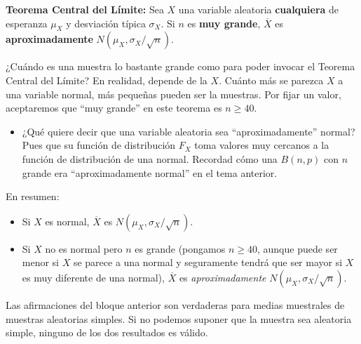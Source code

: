 \documentclass[
  spanish,
  letterpaper,
  DIV=11,
  numbers=noendperiod]{scrreprt}
\providecommand{\tightlist}{%
  \setlength{\itemsep}{0pt}\setlength{\parskip}{0pt}}
\begin{document}
\textbf{Teorema Central del Límite:} Sea \(X\) una variable aleatoria
\textbf{cualquiera} de esperanza \(\mu_X\) y desviación típica
\(\sigma_X\). Si \(n\) es \textbf{muy grande}, \(\overline{X}\) es
\textbf{aproximadamente} \(N(\mu_X, {\sigma_X}/{\sqrt{n}})\).

¿Cuándo es una muestra lo bastante grande como para poder invocar el
Teorema Central del Límite? En realidad, depende de la \(X\). Cuánto más
se parezca \(X\) a una variable normal, más pequeñas pueden ser la
muestras. Por fijar un valor, aceptaremos que ``muy grande'' en este
teorema es \(n\geqslant 40\).

\begin{itemize}
\tightlist
\item
  ¿Qué quiere decir que una variable aleatoria sea ``aproximadamente''
  normal? Pues que su función de distribución \(F_X\) toma valores muy
  cercanos a la función de distribución de una normal. Recordad cómo una
  \(B(n,p)\) con \(n\) grande era ``aproximadamente normal'' en el tema
  anterior.
\end{itemize}

\begin{tcolorbox}[enhanced jigsaw, arc=.35mm, bottomrule=.15mm, bottomtitle=1mm, breakable, colback=white, colbacktitle=quarto-callout-important-color!10!white, colframe=quarto-callout-important-color-frame, coltitle=black, left=2mm, leftrule=.75mm, opacityback=0, opacitybacktitle=0.6, rightrule=.15mm, title=\textcolor{quarto-callout-important-color}{\faExclamation}\hspace{0.5em}{Importante}, titlerule=0mm, toprule=.15mm, toptitle=1mm]

En resumen:

\begin{itemize}
\item
  Si \(X\) es normal, \(\overline{X}\) es
  \(N(\mu_X,{\sigma_X}/{\sqrt{n}})\).
\item
  Si \(X\) no es normal pero \(n\) es grande (pongamos
  \(n\geqslant 40\), aunque puede ser menor si \(X\) se parece a una
  normal y seguramente tendrá que ser mayor si \(X\) es muy diferente de
  una normal), \(\overline{X}\) es \emph{aproximadamente}
  \(N(\mu_X,{\sigma_X}/{\sqrt{n}})\).
\end{itemize}

\end{tcolorbox}

\begin{tcolorbox}[enhanced jigsaw, arc=.35mm, bottomrule=.15mm, bottomtitle=1mm, breakable, colback=white, colbacktitle=quarto-callout-warning-color!10!white, colframe=quarto-callout-warning-color-frame, coltitle=black, left=2mm, leftrule=.75mm, opacityback=0, opacitybacktitle=0.6, rightrule=.15mm, title=\textcolor{quarto-callout-warning-color}{\faExclamationTriangle}\hspace{0.5em}{Advertencia}, titlerule=0mm, toprule=.15mm, toptitle=1mm]

Las afirmaciones del bloque anterior son verdaderas para medias
muestrales de muestras aleatorias simples. Si no podemos suponer que la
muestra sea aleatoria simple, ninguno de los dos resultados es válido.

\end{tcolorbox}
\end{document}
